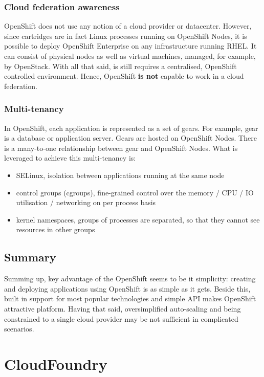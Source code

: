 \subsubsection{Cloud federation awareness}
OpenShift does not use any notion of a cloud provider or datacenter. However, since cartridges are in fact Linux processes running on OpenShift Nodes, it is possible to deploy  OpenShift Enterprise on any infrastructure running RHEL. It can consist of physical nodes as well as virtual machines, managed, for example, by OpenStack. With all that said, is still requires a centralised, OpenShift controlled environment. Hence, OpenShift \textbf{is not} capable to work in a cloud federation.

\subsubsection{Multi-tenancy}
In OpenShift, each application is represented as a set of gears. For example, gear is a database or application server. Gears are hosted on OpenShift Nodes. There is a many-to-one relationship between gear and OpenShift Nodes. What is leveraged to achieve this multi-tenancy is:
\begin{itemize}
 \item SELinux, isolation between applications running at the same node
 \item control groups (cgroups), fine-grained control over the memory / CPU / IO utilisation / networking on per process basis
 \item kernel namespaces, groups of processes are separated, so that they cannot see resources in other groups
\end{itemize}

\subsection{Summary}
Summing up, key advantage of the OpenShift seems to be it simplicity: creating and deploying applications using OpenShift is as simple as it gets. Beside this, built in support for most popular technologies and simple API makes OpenShift attractive platform. Having that said, oversimplified auto-scaling and being constrained to a single cloud provider may be not sufficient in complicated scenarios.

\section{CloudFoundry}
